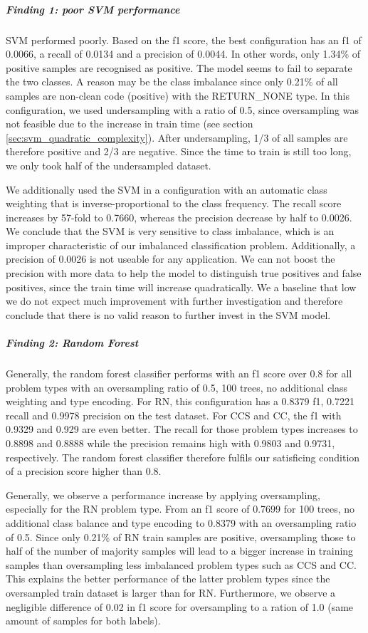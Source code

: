 \subparagraph{Finding 1: poor SVM performance}
SVM performed poorly. Based on the f1 score, the best configuration has an f1 of 0.0066, a recall of 0.0134 and a precision of 0.0044. In other words, only 1.34\% of positive samples are recognised as positive. The model seems to fail to separate the two classes. A reason may be the class imbalance since only 0.21\% of all samples are non-clean code (positive) with the RETURN\_NONE type. In this configuration, we used undersampling with a ratio of 0.5, since oversampling was not feasible due to the increase in train time (see section \ref{sec:svm_quadratic_complexity}). After undersampling, 1/3 of all samples are therefore positive and 2/3 are negative. Since the time to train is still too long, we only took half of the undersampled dataset. 

We additionally used the SVM in a configuration with an automatic class weighting that is inverse-proportional to the class frequency. The recall score increases by 57-fold to 0.7660, whereas the precision decrease by half to 0.0026. We conclude that the SVM is very sensitive to class imbalance, which is an improper characteristic of our imbalanced classification problem. Additionally, a precision of 0.0026 is not useable for any application. We can not boost the precision with more data to help the model to distinguish true positives and false positives, since the train time will increase quadratically. We a baseline that low we do not expect much improvement with further investigation and therefore conclude that there is no valid reason to further invest in the SVM model.


\subparagraph{Finding 2: Random Forest}
Generally, the random forest classifier performs with an f1 score over 0.8 for all problem types with an oversampling ratio of 0.5, 100 trees, no additional class weighting and type encoding. For RN, this configuration has a 0.8379 f1, 0.7221 recall and 0.9978 precision on the test dataset. For CCS and CC, the f1 with 0.9329 and 0.929 are even better. The recall for those problem types increases to 0.8898 and 0.8888 while the precision remains high with 0.9803 and 0.9731, respectively. The random forest classifier therefore fulfils our satisficing condition of a precision score higher than 0.8.

Generally, we observe a performance increase by applying oversampling, especially for the RN problem type. From an f1 score of 0.7699 for 100 trees, no additional class balance and type encoding to 0.8379 with an oversampling ratio of 0.5. Since only 0.21\% of RN train samples are positive, oversampling those to half of the number of majority samples will lead to a bigger increase in training samples than oversampling less imbalanced problem types such as CCS and CC. This explains the better performance of the latter problem types since the oversampled train dataset is larger than for RN. Furthermore, we observe a negligible difference of 0.02 in f1 score for oversampling to a ration of 1.0 (same amount of samples for both labels).

